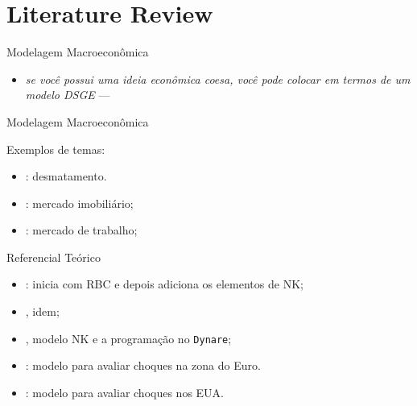\documentclass[presentation.tex]{subfiles}
\begin{document}
\section{Literature Review}

	
\begin{frame}[fragile]{Modelagem Macroeconômica}
	
	\begin{itemize}
		\item \textit{se você possui uma ideia econômica coesa, você pode colocar em termos de um modelo DSGE} --- \textcite{solis-garcia_ucb_2022}
	\end{itemize}
	
\end{frame}


\begin{frame}[fragile]{Modelagem Macroeconômica}
	
Exemplos de temas:	
	\begin{itemize}
		
		\item \textcite{pereira_desmatamento_2013}: desmatamento.
		
		\item \textcite{albuquerquemello_mercado_2018}: mercado imobiliário;

		\item \textcite{ribeiro_alongamento_2023}: mercado de trabalho;

	\end{itemize}
	
\end{frame}


\begin{frame}[fragile]{Referencial Teórico}
	
	\begin{itemize}
		
		\item \textcite{costa_junior_understanding_2016}: inicia com RBC e depois adiciona os elementos de NK;
		
		\item \textcite{gali_monetary_2015}, idem;
		
		\item \textcite{bergholt_basic_2012}, modelo NK e a programação no \texttt{Dynare};
		
		\item \textcite{smets_estimated_2003}: modelo para avaliar choques na zona do Euro.
		
		\item \textcite{smets_shocks_2007}: modelo para avaliar choques nos EUA.
		
	\end{itemize}
	
\end{frame}
\end{document}
